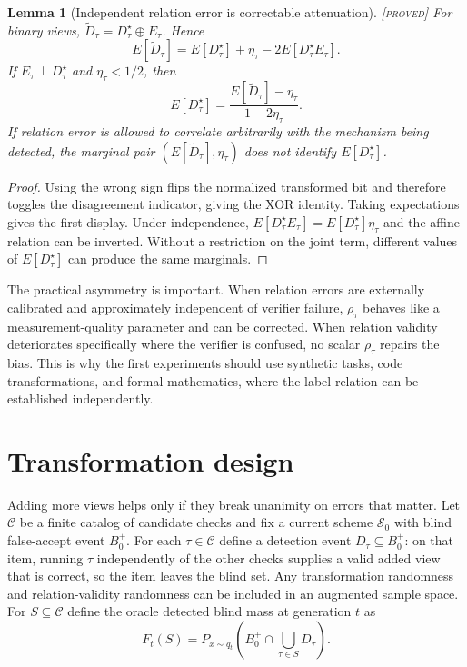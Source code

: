 \documentclass[11pt]{article}
\newtheorem{lemma}{Lemma}
\theoremstyle{definition}
\theoremstyle{remark}
\newcommand{\status}[1]{\hfill{\normalfont\small\textsc{[#1]}}}
\begin{document}
\begin{lemma}[Independent relation error is correctable attenuation]\label{lem:rho}\status{proved}
For binary views, $\widetilde D_\tau=D_\tau^\star\oplus E_\tau$. Hence
\[
E[\widetilde D_\tau]=E[D_\tau^\star]+\eta_\tau-2E[D_\tau^\star E_\tau].
\]
If $E_\tau\perp D_\tau^\star$ and $\eta_\tau<1/2$, then
\[
E[D_\tau^\star]=\frac{E[\widetilde D_\tau]-\eta_\tau}{1-2\eta_\tau}.
\]
If relation error is allowed to correlate arbitrarily with the mechanism being detected, the marginal pair $(E[\widetilde D_\tau],\eta_\tau)$ does not identify $E[D_\tau^\star]$.
\end{lemma}
\begin{proof}
Using the wrong sign flips the normalized transformed bit and therefore toggles the disagreement indicator, giving the XOR identity. Taking expectations gives the first display. Under independence, $E[D_\tau^\star E_\tau]=E[D_\tau^\star]\eta_\tau$ and the affine relation can be inverted. Without a restriction on the joint term, different values of $E[D_\tau^\star]$ can produce the same marginals.
\end{proof}

The practical asymmetry is important. When relation errors are externally calibrated and approximately independent of verifier failure, $\rho_\tau$ behaves like a measurement-quality parameter and can be corrected. When relation validity deteriorates specifically where the verifier is confused, no scalar $\rho_\tau$ repairs the bias. This is why the first experiments should use synthetic tasks, code transformations, and formal mathematics, where the label relation can be established independently.

\section{Transformation design}\label{sec:design}

Adding more views helps only if they break unanimity on errors that matter. Let $\mathcal{C}$ be a finite catalog of candidate checks and fix a current scheme $\mathcal{S}_0$ with blind false-accept event $B_0^+$. For each $\tau\in\mathcal{C}$ define a detection event $D_\tau\subseteq B_0^+$: on that item, running $\tau$ independently of the other checks supplies a valid added view that is correct, so the item leaves the blind set. Any transformation randomness and relation-validity randomness can be included in an augmented sample space. For $S\subseteq\mathcal{C}$ define the oracle detected blind mass at generation $t$ as
\[
F_t(S)=P_{x\sim q_t}\!\left(B_0^+\cap\bigcup_{\tau\in S}D_\tau\right).
\]
\end{document}
